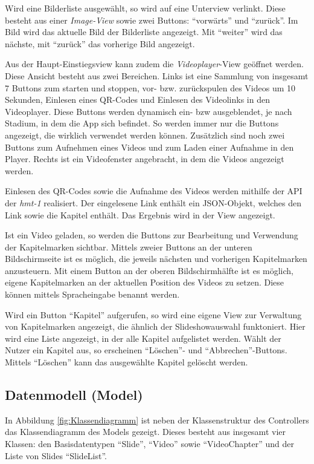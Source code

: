 Wird eine Bilderliste ausgewählt, so wird auf eine Unterview verlinkt. Diese besteht aus einer \emph{Image-View} sowie zwei Buttons: \enquote{vorwärts} und \enquote{zurück}. Im Bild wird das aktuelle Bild der Bilderliste angezeigt. Mit \enquote{weiter} wird das nächste, mit \enquote{zurück} das vorherige Bild angezeigt.

Aus der Haupt-Einstiegsview kann zudem die \emph{Videoplayer}-View geöffnet werden. Diese Ansicht besteht aus zwei Bereichen. Links ist eine Sammlung von insgesamt 7 Buttons zum starten und stoppen, vor- bzw. zurückspulen des Videos um 10 Sekunden, Einlesen eines QR-Codes und Einlesen des Videolinks in den Videoplayer. Diese Buttons werden dynamisch ein- bzw ausgeblendet, je nach Stadium, in dem die App sich befindet. So werden immer nur die Buttons angezeigt, die wirklich verwendet werden können. Zusätzlich sind noch zwei Buttons zum Aufnehmen eines Videos und zum Laden einer Aufnahme in den Player. Rechts ist ein Videofenster angebracht, in dem die Videos angezeigt werden.

Einlesen des QR-Codes sowie die Aufnahme des Videos werden mithilfe der API der \emph{hmt-1} realisiert. Der eingelesene Link enthält ein JSON-Objekt, welches den Link sowie die Kapitel enthält. Das Ergebnis wird in der View angezeigt.

Ist ein Video geladen, so werden die Buttons zur Bearbeitung und Verwendung der Kapitelmarken sichtbar. Mittels zweier Buttons an der unteren Bildschirmseite ist es möglich, die jeweils nächsten und vorherigen Kapitelmarken anzusteuern. Mit einem Button an der oberen Bildschirmhälfte ist es möglich, eigene Kapitelmarken an der aktuellen Position des Videos zu setzen. Diese können mittels Spracheingabe benannt werden.

Wird ein Button \enquote{Kapitel} aufgerufen, so wird eine eigene View zur Verwaltung von Kapitelmarken angezeigt, die ähnlich der Slideshowauswahl funktoniert. Hier wird eine Liste angezeigt, in der alle Kapitel aufgelistet werden. Wählt der Nutzer ein Kapitel aus, so erscheinen \enquote{Löschen}- und \enquote{Abbrechen}-Buttons. Mittels \enquote{Löschen} kann das ausgewählte Kapitel gelöscht werden. 
%
%
%
%
%
%
\subsection{Datenmodell (Model)}
\label{sec:Datenmodell}
In Abbildung \ref{fig:Klassendiagramm} ist neben der Klassenstruktur des Controllers das Klassendiagramm des Models gezeigt. Dieses besteht aus insgesamt vier Klassen: den Basisdatentypen \enquote{Slide}, \enquote{Video} sowie \enquote{VideoChapter} und der Liste von Slides \enquote{SlideList}. 

